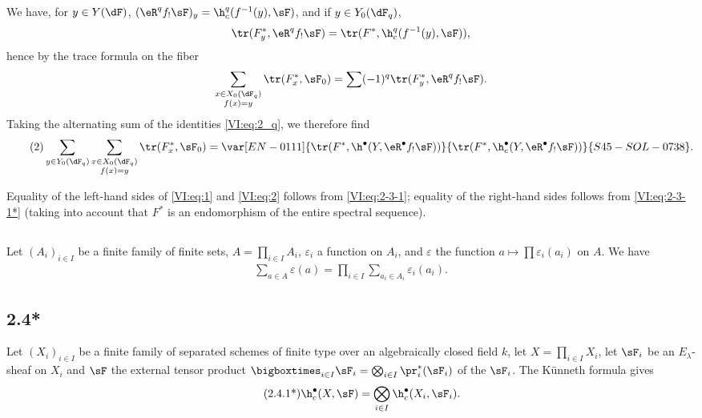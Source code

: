 We have, for $y\in Y(\dF)$, $(\eR^q f_! \sF)_y = \h_c^q(f^{-1}(y),\sF)$, and if 
$y\in Y_0(\dF_q)$, 
\[
  \tr(F_y^\ast,\eR^q f_! \sF) = \tr(F^\ast,\h_c^q(f^{-1}(y),\sF)) \text{,}
\]
hence by the trace formula on the fiber 
\[
  \sum_{\substack{x\in X_0(\dF_q) \\ f(x) = y}} \tr(F_x^\ast,\sF_0) = \sum (-1)^q \tr(F_y^\ast,\eR^q f_! \sF) \text{.}
\]
Taking the alternating sum of the identities \eqref{VI:eq:2_q}, we therefore find 
\begin{align*}\tag{2}\label{VI:eq:2}
  \sum_{y\in Y_0(\dF_q)} \sum_{\substack{x \in X_0(\dF_q) \\ f(x) = y}} \tr(F_x^\ast,\sF_0) = \var[EN-0111]{\tr(F^\ast,\h^\bullet(Y,\eR^\bullet f_! \sF))}{\tr(F^\ast,\h_c^\bullet(Y,\eR^\bullet f_! \sF))}{S45-SOL-0738} \text{.}
\end{align*}

Equality of the left-hand sides of \eqref{VI:eq:1} and \eqref{VI:eq:2} 
follows from \eqref{VI:eq:2-3-1}; equality of the right-hand sides follows from 
\eqref{VI:eq:2-3-1*} (taking into account that $F^\ast$ is an endomorphism of 
the entire spectral sequence). 





\subsection{}\label{VI:2-4}

Let $(A_i)_{i\in I}$ be a finite family of finite sets, 
$A=\prod_{i\in I} A_i$, $\varepsilon_i$ a function on $A_i$, and 
$\varepsilon$ the function $a\mapsto \prod \varepsilon_i(a_i)$ on $A$. We have 
\begin{align*}\tag{2.4.1}\label{VI:eq:2-4-1}
  \sum_{a\in A} \varepsilon(a) = \prod_{i\in I} \sum_{a_i\in A_i} \varepsilon_i(a_i) \text{.}
\end{align*}





\subsection*{2.4*}\label{VI:2-4*}

Let $(X_i)_{i\in I}$ be a finite family of separated schemes of finite type 
over an algebraically closed field $k$, let $X=\prod_{i\in I} X_i$, let $\sF_i$ be an 
$E_\lambda$-sheaf on $X_i$ and $\sF$ the external tensor product 
$\bigboxtimes_{i\in I}\sF_i = \bigotimes_{i\in I} \pr_i^\ast(\sF_i)$ 
of the $\sF_i$. 
The K\"unneth formula gives 
\begin{align*}\tag{2.4.1*}\label{VI:eq:2-4-1*}
  \h_c^\bullet(X,\sF) = \bigotimes_{i\in I} \h_c^\bullet(X_i,\sF_i) \text{.}
\end{align*}

